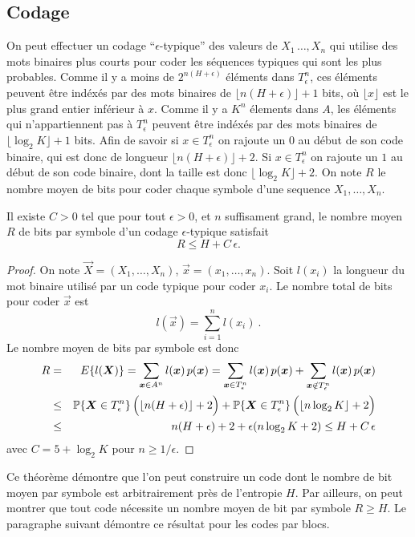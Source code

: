 \subsection{Codage}
On peut effectuer un codage ``$\epsilon$-typique'' des
valeurs de $X_1\,\dots,X_n$ qui utilise des mots binaires plus courts
pour coder les s\'equences typiques qui sont les plus probables.
Comme il y a moins de $2^{n(H+\epsilon)}$ \'el\'ements
dans $T^n_\epsilon$, ces \'el\'ements peuvent \^etre ind\'ex\'es
par des mots binaires de $\lfloor n(H+\epsilon)\rfloor + 1$
bits, o\`u  $\lfloor x \rfloor$ est le plus grand entier inf\'erieur
\`a $x$.
Comme il y a $K^n$ \'elements dans $A$, les \'el\'ements
qui n'appartiennent pas \`a $T^n_\epsilon$ peuvent \^etre
ind\'ex\'es par des mots binaires de
$\lfloor \log_2 K \rfloor + 1$ bits. Afin de savoir si
$x \in T^n_\epsilon$ on rajoute
un $0$ au d\'ebut de son code binaire, qui est donc de longueur
$\lfloor n(H+\epsilon)\rfloor + 2$. Si $x \in T^n_\epsilon$
on rajoute un $1$ au d\'ebut de son code binaire, dont la
taille est donc $\lfloor \log_2 K \rfloor + 2$.
On note $R$ le nombre moyen de bits pour coder chaque
symbole d'une sequence $X_1, \dots , X_n$.


\begin{theorem}
Il existe $C > 0$ tel que pour tout
$\epsilon > 0$, et $n$ suffisament grand,
le nombre moyen $R$ de bits par symbole d'un
codage $\epsilon$-typique satisfait
\[
R \leq H + C\, \epsilon .
\]
\end{theorem}
\begin{proof}
On note $\vec X = (X_1, \dots , X_n )$,
$\vec x = (x_1 , \dots , x_n )$. Soit $l(x_i)$ la longueur du
mot binaire utilis\'e par un code typique pour coder $x_i$.
Le nombre total de bits pour coder $\vec x$ est
\[
l(\vec x) = \sum_{i=1}^n l(x_i)~.
\]
Le nombre moyen de bits par symbole est donc
\begin{eqnarray*}
R &=& E \{ l(\vec X)\} =
\sum_{\vec x \in A^n} l(\vec x)\, p(\vec x) =
\sum_{\vec x \in T^n_\epsilon} l(\vec x)\, p(\vec x) +
\sum_{\vec x \nin T^n_\epsilon} l(\vec x)\, p(\vec x) \\
&\leq& \PP \{\vec X \in T^n_\epsilon \}\,
\Bigl(\lfloor n(H+\epsilon)
\rfloor + 2\Bigr)
+ \PP \{\vec X \in T^n_\epsilon \}\,
\Bigl( \lfloor n \log_2 K \rfloor +
2\Bigr) \\
&\leq& n(H+\epsilon) + 2 + \epsilon ( n \log_2 K + 2) \leq
 H + C\, \epsilon
\end{eqnarray*}
avec $C = 5 + \log_2 K $ pour $n \geq 1/\epsilon$.
\end{proof}
Ce th\'eor\`eme d\'emontre que l'on peut construire un code
dont le nombre de bit moyen par symbole est arbitrairement
pr\`es de l'entropie $H$. Par ailleurs, on peut montrer
que tout code n\'ecessite un nombre moyen de bit par symbole $R \geq H$. Le paragraphe
suivant d\'emontre ce r\'esultat pour les codes par blocs.


